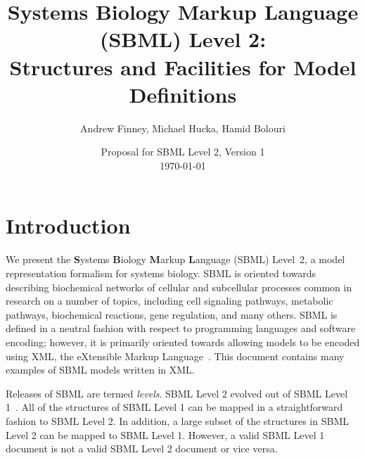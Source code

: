 \documentclass[10pt,twocolumntoc]{cekarticle}
\begin{document}

\title{Systems Biology Markup Language (SBML) Level 2:\\
  Structures and Facilities for Model Definitions}

\author{Andrew Finney, Michael Hucka, Hamid Bolouri}


\address{Systems Biology Workbench Development Group\\
  ERATO Kitano Systems Biology Project\\
  Control and Dynamical Systems, MC 107-81\\
  California Institute of Technology, Pasadena, CA 91125, USA\\[3pt]
  \url{http://www.cds.caltech.edu/erato}}


\date{Proposal for SBML Level 2, Version 1\\[5pt]\today{}}

\maketitlepage


\section{Introduction}
\label{sec:introduction}

We present the \textbf{S}ystems \textbf{B}iology \textbf{M}arkup
\textbf{L}anguage (SBML) Level~2, a model representation formalism for
systems biology.  SBML is oriented towards describing biochemical networks
of cellular and subcellular processes common in research on a number of
topics, including cell signaling pathways, metabolic pathways, biochemical
reactions, gene regulation, and many others.  SBML is defined in a neutral
fashion with respect to programming languages and software encoding;
however, it is primarily oriented towards allowing models to be encoded
using XML, the eXtensible Markup Language~\citep{bosak:1999,bray:2000}.
This document contains many examples of SBML models written in XML.

Releases of SBML are termed \emph{levels}.  SBML Level 2 evolved out of
SBML Level 1~\citep{hucka:2001}.  All of the structures of SBML Level 1 can
be mapped in a straightforward fashion to SBML Level 2.  In addition, a
large subset of the structures in SBML Level 2 can be mapped to SBML Level
1.  However, a valid SBML Level 1 document is not a valid SBML Level 2
document or vice versa.
\end{document}
